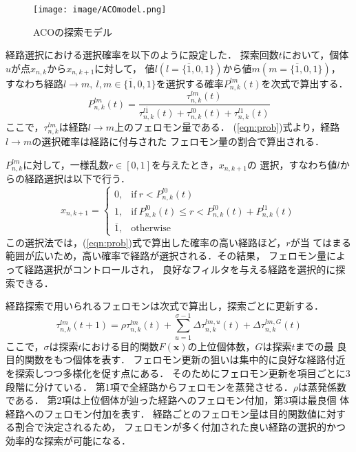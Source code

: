 \documentclass[dvipdfmx,9pt]{ieej}
\begin{document}
\vspace{-1zh}
\begin{figure}[h]
    \centering
    \texttt{[image: image/ACOmodel.png]}
    \caption{ACOの探索モデル}
    \label{fig:ACOmodel.png}
\end{figure}
\vspace{1zh}

経路選択における選択確率を以下のように設定した．
探索回数$t$において，個体$u$が点$x_{n,k}$から$x_{n,k+1}$に対して，
値$l (l=\{\overline{1}, 0, 1\})$から値$m (m=\{\overline{1}, 0, 1\})$，
すなわち経路$l\rightarrow m, \
l,m\in\{\overline{1},0,1\}$を選択する確率$P^{lm}_{n,k}(t)$を次式で算出する．
\begin{equation}
 P^{lm}_{n,k}(t)=\frac{\tau^{lm}_{n,k}(t)}{\tau^{l\overline{1}}_{n,k}(t)+\tau^{l0}_{n,k}(t)+\tau^{l1}_{n,k}(t)}
\label{eqn:prob}
\end{equation}
ここで，$\tau^{lm}_{n, k}$は経路$l\rightarrow m$上のフェロモン量である．
(\ref{eqn:prob})式より，経路$l\rightarrow m$の選択確率は経路に付与された
フェロモン量の割合で算出される．

$P^{lm}_{n,k}$に対して，一様乱数$r\in [0,1]$を与えたとき，$x_{n, k+1}$の
選択，すなわち値$l$からの経路選択は以下で行う．
\begin{equation}
 x_{n, k+1}=\left\{
\begin{array}{ll}
0, & \mbox{if} \ r < P^{l0}_{n,k}(t) \\
1, & \mbox{if} \ P^{l0}_{n,k}(t)\leq r < P^{l0}_{n,k}(t)+P^{l1}_{n,k}(t) \\
\overline{1}, & \mbox{otherwise}
\end{array}
\right.
\end{equation}
この選択法では，(\ref{eqn:prob})式で算出した確率の高い経路ほど，$r$が当
てはまる範囲が広いため，高い確率で経路が選択される．その結果，
フェロモン量によって経路選択がコントロールされ，
良好なフィルタを与える経路を選択的に探索できる．


経路探索で用いられるフェロモンは次式で算出し，探索ごとに更新する．
    \begin{equation}
    \tau^{lm}_{n,k}(t+1)=\rho
     \tau^{lm}_{n,k}(t)+\sum_{u=1}^{\sigma-1}\Delta\tau^{lm,u}_{n,
     k}(t)+\Delta\tau^{lm, G}_{n, k}(t)
   \label{eqn:phero}
   \end{equation}
ここで，$\sigma$は探索$t$における目的関数$F(\bm{x})$の上位個体数，$G$は探索$t$までの最
良目的関数をもつ個体を表す．
フェロモン更新の狙いは集中的に良好な経路付近を探索しつつ多様化を促す点にある．
そのためにフェロモン更新を項目ごとに3段階に分けている．
第1項で全経路からフェロモンを蒸発させる．$\rho$は蒸発係数である．
第2項は上位個体が辿った経路へのフェロモン付加，第3項は最良個
体経路へのフェロモン付加を表す．
経路ごとのフェロモン量は目的関数値に対する割合で決定されるため，
フェロモンが多く付加された良い経路の選択的かつ効率的な探索が可能になる．
   
\end{document}
